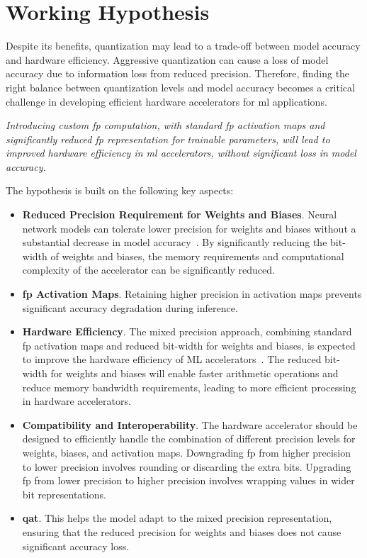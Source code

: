 \section{Working Hypothesis}
Despite its benefits, quantization may lead to a trade-off between model accuracy and hardware efficiency. Aggressive quantization can cause a loss of model accuracy due to information loss from reduced precision. Therefore, finding the right balance between quantization levels and model accuracy becomes a critical challenge in developing efficient hardware accelerators for \gls{ml} applications.

\textit{Introducing custom \gls{fp} computation, with standard \gls{fp} activation maps and significantly reduced \gls{fp} representation for trainable parameters, will lead to improved hardware efficiency in \gls{ml} accelerators, without significant loss in model accuracy.
}

The hypothesis is built on the following key aspects:

\begin{itemize}
	\item \textbf{Reduced Precision Requirement for Weights and Biases}. Neural network models can tolerate lower precision for weights and biases without a substantial decrease in model accuracy~\cite{lai2017deep}. By significantly reducing the bit-width of weights and biases, the memory requirements and computational complexity of the accelerator can be significantly reduced.
	\item \textbf{\gls{fp} Activation Maps}. Retaining higher precision in activation maps prevents significant accuracy degradation during inference.
	\item \textbf{Hardware Efficiency}. The mixed precision approach, combining standard \gls{fp} activation maps and reduced bit-width for weights and biases, is expected to improve the hardware efficiency of ML accelerators~\cite{lai2017deep}. The reduced bit-width for weights and biases will enable faster arithmetic operations and reduce memory bandwidth requirements, leading to more efficient processing in hardware accelerators.
	\item \textbf{Compatibility and Interoperability}. The hardware accelerator should be designed to efficiently handle the combination of different precision levels for weights, biases, and activation maps. Downgrading \gls{fp} from higher precision to lower precision involves rounding or discarding the extra bits. Upgrading \gls{fp} from lower precision to higher precision involves wrapping values in wider bit representations.
	\item \textbf{\gls{qat}}. This helps the model adapt to the mixed precision representation, ensuring that the reduced precision for weights and biases does not cause significant accuracy loss.
\end{itemize}

